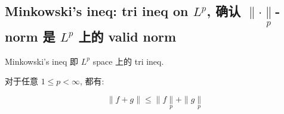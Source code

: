 \subsection{\texorpdfstring{Minkowski's ineq: tri ineq on \(L^{p}\), 确认 \(\parallel \cdot \underset{p}{\parallel}\)-norm 是 \(L^{p}\) 上的 valid norm}{Minkowski's ineq: tri ineq on L\^{}\{p\}, 确认 \textbackslash parallel \textbackslash cdot \textbackslash underset\{p\}\{\textbackslash parallel\}-norm 是 L\^{}\{p\} 上的 valid norm}}

Minkowski's ineq 即 \(L^{p}\) space 上的 tri ineq.

\begin{corollary}{}

对于任意 \(1 \leq p < \infty\), 都有:

\[\parallel f + g \parallel \leq \parallel f\underset{p}{\parallel} + \parallel g\underset{p}{\parallel}\]

\end{corollary}

